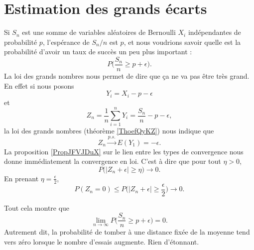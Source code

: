 \section{Estimation des grands écarts}

Si \( S_n\) est une somme de variables aléatoires de Bernoulli \( X_i\) indépendantes de probabilité \( p\), l'espérance de \( S_n/n\) est \( p\), et nous voudrions savoir quelle est la probabilité d'avoir un taux de succès un peu plus important :
\begin{equation}
    P\big( \frac{ S_n }{ n }\geq p+\epsilon \big).
\end{equation}
La loi des grands nombres nous permet de dire que ça ne va pas être très grand. En effet si nous posons
\begin{equation}
    Y_i=X_i-p-\epsilon
\end{equation}
et
\begin{equation}
    Z_n=\frac{1}{ n }\sum_{i=1}^nY_i=\frac{ S_n }{ n }-p-\epsilon,
\end{equation}
la loi des grands nombres (théorème \ref{ThoefQyKZ}) nous indique que
\begin{equation}
    Z_n\stackrel{p.s.}{\longrightarrow}E(Y_1)=-\epsilon.
\end{equation}
La proposition \ref{PropJFVJDuX} sur le lien entre les types de convergence nous donne immédiatement la convergence en loi. C'est à dire que pour tout \( \eta>0\),
\begin{equation}
    P\Big( | Z_n+\epsilon |\geq \eta \Big)\to 0.
\end{equation}
En prenant \( \eta=\frac{ \epsilon }{2}\),
\begin{equation}
    P(Z_n=0)\leq P\big( | Z_n+\epsilon |\geq \frac{ \epsilon }{2} \big)\to 0.
\end{equation}

Tout cela montre que
\begin{equation}
    \lim_{n\to \infty} P\big( \frac{ S_n }{ n }\geq p+\epsilon \big)=0.
\end{equation}
Autrement dit, la probabilité de tomber à une distance fixée de la moyenne tend vers zéro lorsque le nombre d'essais augmente. Rien d'étonnant.

